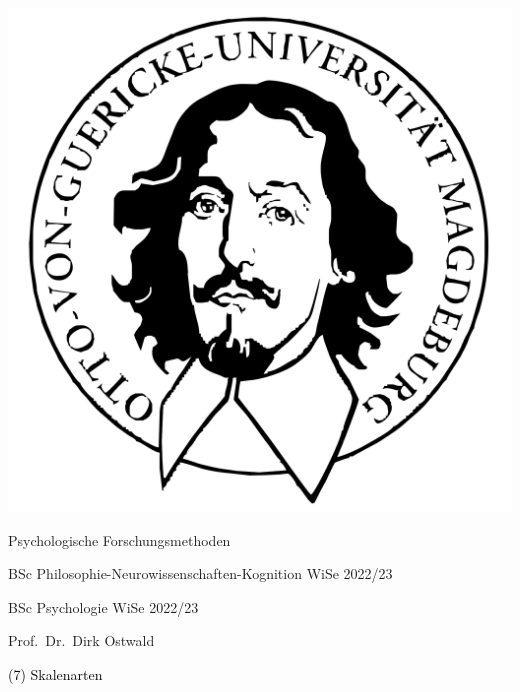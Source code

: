 \documentclass[
  8pt,
  ignorenonframetext,
]{beamer}
\author{}
\date{\vspace{-2.5em}}
\begin{document}
\begin{frame}[plain]{}
\protect\hypertarget{section}{}
\center

\begin{center}\includegraphics[width=0.2\linewidth]{7_Abbildungen/pfm_7_otto} \end{center}

\vspace{2mm}

\Large

Psychologische Forschungsmethoden \vspace{6mm}

\normalsize

BSc Philosophie-Neurowissenschaften-Kognition WiSe 2022/23

BSc Psychologie WiSe 2022/23

\large
\vspace{6mm}

Prof.~Dr.~Dirk Ostwald
\end{frame}

\begin{frame}[plain]{}
\protect\hypertarget{section-1}{}
\vfill
\center
\huge

\textcolor{black}{(7) Skalenarten} \vfill
\end{frame}
\end{document}
